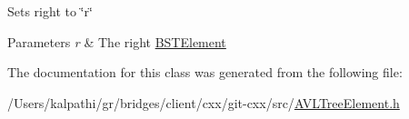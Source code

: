 Sets right to \char`\"{}r\char`\"{}


\begin{DoxyParams}{Parameters}
{\em r} & The right \hyperlink{classbridges_1_1_b_s_t_element}{B\+S\+T\+Element} \\
\hline
\end{DoxyParams}


The documentation for this class was generated from the following file\+:\begin{DoxyCompactItemize}
\item 
/\+Users/kalpathi/gr/bridges/client/cxx/git-\/cxx/src/\hyperlink{_a_v_l_tree_element_8h}{A\+V\+L\+Tree\+Element.\+h}\end{DoxyCompactItemize}

